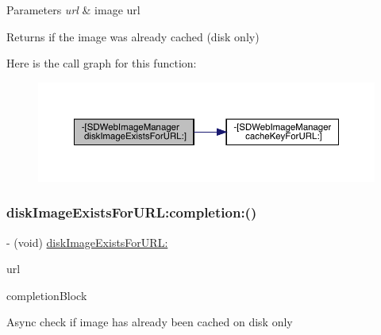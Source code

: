 \begin{DoxyParams}{Parameters}
{\em url} & image url\\
\hline
\end{DoxyParams}
\begin{DoxyReturn}{Returns}
if the image was already cached (disk only) 
\end{DoxyReturn}
Here is the call graph for this function\+:\nopagebreak
\begin{figure}[H]
\begin{center}
\leavevmode
\includegraphics[width=350pt]{interface_s_d_web_image_manager_a7ed53c304da787466f777c636447e6d0_cgraph}
\end{center}
\end{figure}
\mbox{\label{interface_s_d_web_image_manager_a05c93459fc0727ca8e7139cfc9d9750c}} 
\subsubsection{\texorpdfstring{disk\+Image\+Exists\+For\+U\+R\+L\+:completion\+:()}{diskImageExistsForURL:completion:()}\hspace{0.1cm}{\footnotesize\ttfamily [1/3]}}
{\footnotesize\ttfamily -\/ (void) \mbox{\hyperlink{interface_s_d_web_image_manager_a7ed53c304da787466f777c636447e6d0}{disk\+Image\+Exists\+For\+U\+R\+L\+:}} \begin{DoxyParamCaption}\item[{(N\+S\+U\+RL $\ast$)}]{url }\item[{completion:(S\+D\+Web\+Image\+Check\+Cache\+Completion\+Block)}]{completion\+Block }\end{DoxyParamCaption}}

Async check if image has already been cached on disk only


